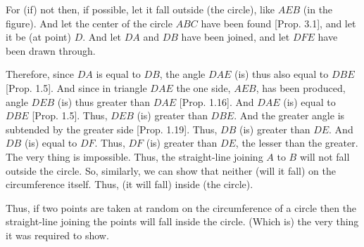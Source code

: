\begin{Parallel}{}{}
{For (if) not then, if possible, let it fall outside (the circle), like $AEB$ (in the figure). And let the center of the circle $ABC$ have been found [Prop. 3.1], and let it be (at point) $D$. And let $DA$ and $DB$ have been joined, and let $DFE$ have been
drawn through.

Therefore, since $DA$ is equal to $DB$, the angle $DAE$ (is) thus also equal to
$DBE$ [Prop. 1.5]. And since in triangle $DAE$ the one side, $AEB$, has been
produced, angle $DEB$ (is) thus greater than $DAE$ [Prop. 1.16]. And
$DAE$ (is) equal to $DBE$ [Prop. 1.5]. Thus, $DEB$ (is) greater than $DBE$.
And the greater angle is subtended by the greater side [Prop. 1.19].
Thus, $DB$ (is) greater than $DE$. And $DB$ (is) equal to $DF$. Thus,
$DF$ (is) greater than $DE$, the lesser than the greater. The very thing is impossible.
Thus, the straight-line joining $A$ to $B$ will not fall outside the
circle. So, similarly, we can show that neither (will it fall) on the
circumference itself. Thus, (it will fall) inside (the circle).

\epsfysize=2.2in
\centerline{}

Thus, if two points are taken at random on the circumference of a circle then
the straight-line joining the points will fall inside the circle. (Which is) the
very thing it was required to show.}
\end{Parallel}

